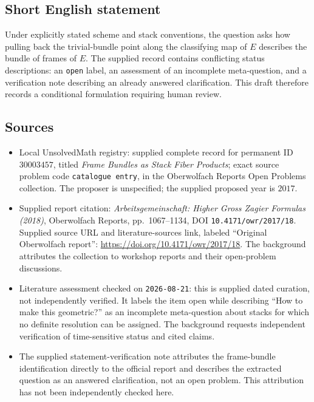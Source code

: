 \documentclass[11pt]{article}
\begin{document}
\subsection{Short English statement}
Under explicitly stated scheme and stack conventions, the question asks how pulling back the trivial-bundle point along the classifying map of \(E\) describes the bundle of frames of \(E\). The supplied record contains conflicting status descriptions: an \texttt{open} label, an assessment of an incomplete meta-question, and a verification note describing an already answered clarification. This draft therefore records a conditional formulation requiring human review.
\subsection{Sources}
\begin{itemize}
\item Local UnsolvedMath registry: supplied complete record for permanent ID \(30003457\), titled \emph{Frame Bundles as Stack Fiber Products}; exact source problem code \texttt{catalogue entry}, in the Oberwolfach Reports Open Problems collection. The proposer is unspecified; the supplied proposed year is \(2017\).
\item Supplied report citation: \emph{Arbeitsgemeinschaft: Higher Gross Zagier Formulas (2018)}, Oberwolfach Reports, pp.~1067--1134, DOI \texttt{10.4171/owr/2017/18}. Supplied source URL and literature-sources link, labeled ``Original Oberwolfach report'': \url{https://doi.org/10.4171/owr/2017/18}. The background attributes the collection to workshop reports and their open-problem discussions.
\item Literature assessment checked on \texttt{2026-08-21}: this is supplied dated curation, not independently verified. It labels the item open while describing ``How to make this geometric?'' as an incomplete meta-question about stacks for which no definite resolution can be assigned. The background requests independent verification of time-sensitive status and cited claims.
\item The supplied statement-verification note attributes the frame-bundle identification directly to the official report and describes the extracted question as an answered clarification, not an open problem. This attribution has not been independently checked here.
\end{itemize}
\end{document}
